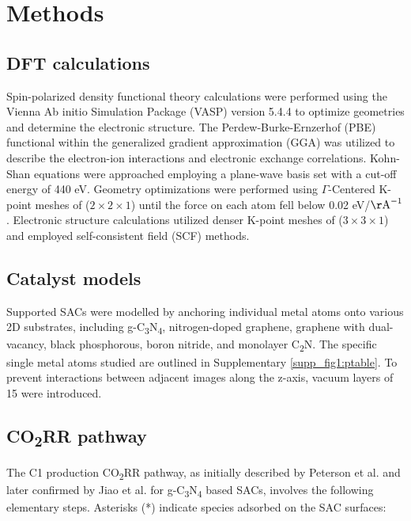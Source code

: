 \documentclass[a4paper, 12pt, titlepage]{article}
\begin{document}
\newpage
\section{Methods}

    \subsection{DFT calculations}
    Spin-polarized density functional theory calculations were performed using the Vienna Ab initio Simulation Package (VASP) version 5.4.4 \cite{kresse1996efficient, kresse1996efficiency, kresse1993ab} to optimize geometries and determine the electronic structure.
    The Perdew-Burke-Ernzerhof (PBE) functional \cite{kresse1996efficient} within the generalized gradient approximation (GGA) \cite{perdew1996generalized} was utilized to describe the electron-ion interactions and electronic exchange correlations.
    Kohn-Shan equations were approached employing a plane-wave basis set with a cut-off energy of 440 eV.
    Geometry optimizations were performed using $\Gamma$-Centered K-point meshes of ($2\times2\times1$) until the force on each atom fell below 0.02 eV/\(\mathrm{\AA}^{-1}\).
    Electronic structure calculations utilized denser K-point meshes of ($3\times3\times1$) and employed self-consistent field (SCF) methods.


    \subsection{Catalyst models}
    Supported SACs were modelled by anchoring individual metal atoms onto various 2D substrates,
    including g-C\textsubscript{3}N\textsubscript{4}, nitrogen-doped graphene,
    graphene with dual-vacancy, black phosphorous, boron nitride, and monolayer C\textsubscript{2}N.
    The specific single metal atoms studied are outlined in Supplementary \cref{supp_fig1:ptable}.
    To prevent interactions between adjacent images along the z-axis, vacuum layers of 15 \text{\AA} were introduced.


    \subsection{CO\textsubscript{2}RR pathway}
    The C1 production CO\textsubscript{2}RR pathway, as initially described by Peterson et al. \cite{peterson2010copper} and later confirmed by Jiao et al. \cite{jiao2017molecular} for g-C\textsubscript{3}N\textsubscript{4} based SACs, involves the following elementary steps.
    Asterisks (*) indicate species adsorbed on the SAC surfaces:
\end{document}
